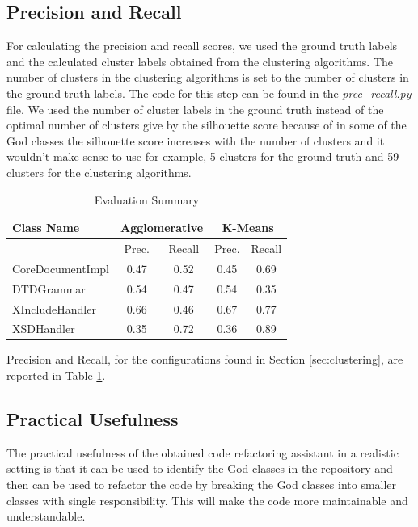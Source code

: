 \documentclass{article}
\newcommand\templateInstruction[1]{
\hl{#1}
}
\begin{document}
\subsection{Precision and Recall}
For calculating the precision and recall scores, we used the ground truth labels and the calculated cluster labels obtained from the clustering algorithms. The number of clusters in the clustering algorithms is set to the number of clusters in the ground truth labels. The code for this step can be found in the \textit{prec\_recall.py} file. We used the number of cluster labels in the ground truth instead of the optimal number of clusters give by the silhouette score because of in some of the God classes the silhouette score increases with the number of clusters and it wouldn't make sense to use for example,
5 clusters for the ground truth and 59 clusters for the clustering algorithms.
\begin{table}[]
    \centering
    \begin{tabular}{lcccc}
        \hline
        \textbf{Class Name} &\multicolumn{2}{c}{\textbf{Agglomerative}} & \multicolumn{2}{c}{\textbf{K-Means}} \\
        \hline
         &Prec. & Recall & Prec. & Recall \\
        \hline\hline
        {CoreDocumentImpl} & {0.47} & {0.52}& {0.45}& {0.69}\\
       {DTDGrammar} & {0.54} & {0.47}& {0.54}& {0.35}\\
        {XIncludeHandler} & {0.66} & {0.46}& {0.67}& {0.77}\\
        {XSDHandler} & {0.35} & {0.72}& {0.36}& {0.89}\\
        \hline
    \end{tabular}
    \caption{Evaluation Summary}
    \label{tab:eval}
\end{table}

Precision and Recall, for the configurations found in Section \ref{sec:clustering}, are reported in Table \ref{tab:eval}.


\subsection{Practical Usefulness}
The practical usefulness of the obtained code refactoring assistant in a realistic setting is that it can be used to identify the God classes in the repository and then can be used to refactor the code by breaking the God classes into smaller classes with single responsibility. 
This will make the code more maintainable and understandable. 
\end{document}
